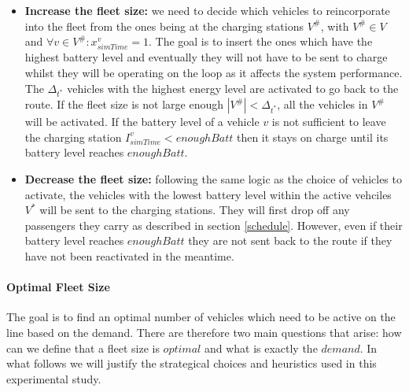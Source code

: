 \documentclass[12pt,a4paper]{article}
\begin{document}
\begin{itemize}
\setlength\itemsep{1pt}
\item \textbf{Increase the fleet size:} we need to decide which vehicles to reincorporate into the fleet from the ones being at the charging stations $V^{\#}$, with $V^{\#} \in V$ and $\forall v \in V^{\#}: x^{v}_{simTime} = 1$. The goal is to insert the ones which have the highest battery level and eventually they will not have to be sent to charge whilst they will be operating on the loop as it affects the system performance. The $\Delta_{t^{*}}$ vehicles with the highest energy level are activated to go back to the route. If the fleet size is not large enough $|V^{\#}| < \Delta_{t^{*}}$, all the vehicles in $V^{\#}$ will be activated. If the battery level of a vehicle $v$ is not sufficient to leave the charging station $I_{simTime}^{v} < enoughBatt$ then it stays on charge until its battery level reaches $enoughBatt$.
\item \textbf{Decrease the fleet size:} following the same logic as the choice of vehicles to activate, the vehicles with the lowest battery level within the active vehciles $V^{*}$ will be sent to the charging stations. They will first drop off any passengers they carry as described in section \ref{schedule}. However, even if their battery level reaches $enoughBatt$ they are not sent back to the route if they have not been reactivated in the meantime.
\end{itemize}

\paragraph{Optimal Fleet Size} The goal is to find an optimal number of vehicles which need to be active on the line based on the demand. There are therefore two main questions that arise: how can we define that a fleet size is $optimal$ and what is exactly the $demand$. In what follows we will justify the strategical choices and heuristics used in this experimental study.
\end{document}
